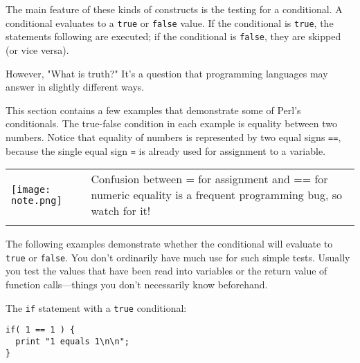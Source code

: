 The main feature of these kinds of constructs is the testing for a conditional. A conditional evaluates to a \verb|true| or \verb|false| value. If the conditional is \verb|true|, the statements following are executed; if the conditional is \verb|false|, they are skipped (or vice versa).

However, "What is truth?" It's a question that programming languages may answer in slightly different ways.

This section contains a few examples that demonstrate some of Perl's conditionals. The true-false condition in each example is equality between two numbers. Notice that equality of numbers is represented by two equal signs \verb|==|, because the single equal sign \verb|=| is already used for assignment to a variable. 


\vspace{-5pt}
\begin{table}[h]
  \begin{center}
    \begin{tabu} to 0.85\linewidth {|X[1,r,m]X[15,l,m]|}
      \tabucline{-}
      \texttt{[image: note.png]} & Confusion between = for assignment and == for numeric equality is a frequent programming bug, so watch for it!\\
      \tabucline{-}
    \end{tabu}
  \end{center}
\end{table}
\vspace{-20pt}

The following examples demonstrate whether the conditional will evaluate to \verb|true| or \verb|false|. You don't ordinarily have much use for such simple tests. Usually you test the values that have been read into variables or the return value of function calls—things you don't necessarily know beforehand.

The \verb|if| statement with a \verb|true| conditional: 

\begin{lstlisting}
if( 1 == 1 ) {
  print "1 equals 1\n\n";
}
\end{lstlisting}

